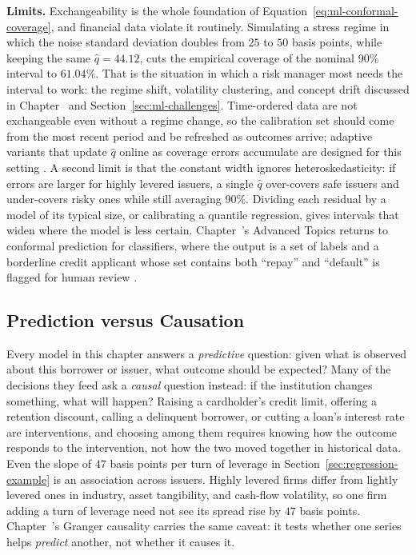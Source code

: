 \documentclass[../ai_in_finance]{subfiles}
\begin{document}
\textbf{Limits.} Exchangeability is the whole foundation of Equation~\eqref{eq:ml-conformal-coverage}, and financial data violate it routinely. Simulating a stress regime in which the noise standard deviation doubles from $25$ to $50$ basis points, while keeping the same $\hat q = 44.12$, cuts the empirical coverage of the nominal 90\% interval to $61.04\%$. That is the situation in which a risk manager most needs the interval to work: the regime shift, volatility clustering, and concept drift discussed in Chapter~ and Section~\ref{sec:ml-challenges}. Time-ordered data are not exchangeable even without a regime change, so the calibration set should come from the most recent period and be refreshed as outcomes arrive; adaptive variants that update $\hat q$ online as coverage errors accumulate are designed for this setting \parencite{gibbs2021adaptive}. A second limit is that the constant width ignores heteroskedasticity: if errors are larger for highly levered issuers, a single $\hat q$ over-covers safe issuers and under-covers risky ones while still averaging 90\%. Dividing each residual by a model of its typical size, or calibrating a quantile regression, gives intervals that widen where the model is less certain. Chapter~'s Advanced Topics returns to conformal prediction for classifiers, where the output is a set of labels and a borderline credit applicant whose set contains both ``repay'' and ``default'' is flagged for human review \parencite[see also][]{angelopoulos2023conformal}.

\subsection{Prediction versus Causation}
\label{sec:ml-causation}

Every model in this chapter answers a \emph{predictive} question: given what is observed about this borrower or issuer, what outcome should be expected? Many of the decisions they feed ask a \emph{causal} question instead: if the institution changes something, what will happen? Raising a cardholder's credit limit, offering a retention discount, calling a delinquent borrower, or cutting a loan's interest rate are interventions, and choosing among them requires knowing how the outcome responds to the intervention, not how the two moved together in historical data. Even the slope of $47$ basis points per turn of leverage in Section~\ref{sec:regression-example} is an association across issuers. Highly levered firms differ from lightly levered ones in industry, asset tangibility, and cash-flow volatility, so one firm adding a turn of leverage need not see its spread rise by $47$ basis points. Chapter~'s Granger causality carries the same caveat: it tests whether one series helps \emph{predict} another, not whether it causes it.
\end{document}
